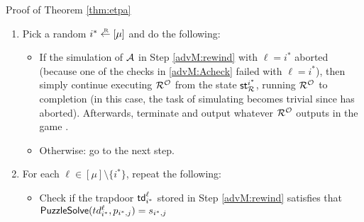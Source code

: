 \begin{namedproof}{Proof of Theorem \ref{thm:etpa}}
\begin{enumerate}[itemsep=0.1cm]
\begin{itemize}[label={\textbullet},itemsep=0.1cm]
                  in Step \ref{advA:corrupt} of \advA.
            \item More precisely, simulate Step \ref{advA:corrupt} of \advA with \(i^{*} = \ell\) by:
                  \begin{enumerate}[topsep=0.1cm,itemsep=0.1cm,ref=(\alph*)]
                    \item Querying \(\Corrupt(i)\) to \(\redR^{\oracle}\) for each \(i \ne \ell\),
                          storing the resulting trapdoors as \((\td_{i}^{\ell})_{i \in [\mu] \setminus \{\ell\}}\).
                    \item\label{advM:Acheck} For each \(i \ne \ell\),
                          aborting the simulation of \advA if
                          \(\PuzzleSolve(\td_{i}^{\ell},p_{i,j}) \ne s_{i,j}\) for some \(j \in [\rho] \setminus S_{i}\).
                  \end{enumerate}
            \item Denote the state of \(\redR^{\oracle}\) after this point by \(\state_{\redR}^{\ell}\).
          \end{itemize}
    \item\label{advM:sample} Pick a random \(i^{*} \sampleR [\mu]\) and do the following:
        \begin{itemize}[label={\textbullet},itemsep=0.1cm]
          \item If the simulation of \(\mathcal{A}\) in Step \ref{advM:rewind} with \(\ell = i^{*}\)
                aborted (because one of the checks in \ref{advM:Acheck} failed with \(\ell = i^{*}\)),
                then simply continue executing \(\redR^{\oracle}\)
                from the state \(\state_{\redR}^{i^{*}}\), running \(\redR^{\oracle}\) to completion
                (in this case, the task of simulating \advA becomes trivial since \advA has aborted).
                Afterwards, terminate and output whatever \(\redR^{\oracle}\) outputs in the game \SICA.
          \item Otherwise: go to the next step.
        \end{itemize}
    \item\label{advM:key} For each \(\ell \in [\mu] \setminus \{i^{*}\}\), repeat the following:
          \begin{itemize}[label={\textbullet},itemsep=0.1cm]
            \item Check if the trapdoor \(\mathsf{td}_{i^{*}}^{\ell}\)
                  stored in Step \ref{advM:rewind} satisfies that
                  \(\mathsf{PuzzleSolve}(td_{i^{*}}^{\ell},p_{i^{*},j}) = s_{i^{*},j}\)

\end{itemize}
\end{enumerate}
\end{namedproof}

